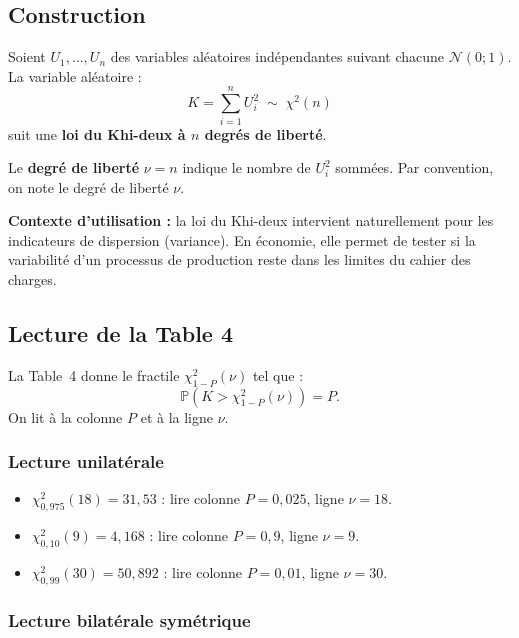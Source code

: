 \documentclass[11pt,a4paper]{article}
\newcommand{\N}{\mathcal{N}}
\newcommand{\Prob}{\mathbb{P}}
\renewcommand{\P}{\Prob}
\begin{document}
\subsection{Construction}

\begin{defbox}
Soient $U_1,\ldots,U_n$ des variables al\'eatoires ind\'ependantes suivant chacune $\N(0;1)$. La variable al\'eatoire :
$$K = \sum_{i=1}^{n} U_i^2 \;\sim\; \chi^2(n)$$
suit une \textbf{loi du Khi-deux \`a $n$ degr\'es de libert\'e}.

Le \textbf{degr\'e de libert\'e} $\nu = n$ indique le nombre de $U_i^2$ somm\'ees. Par convention, on note le degr\'e de libert\'e $\nu$.
\end{defbox}

\textbf{Contexte d'utilisation :} la loi du Khi-deux intervient naturellement pour les indicateurs de dispersion (variance). En \'economie, elle permet de tester si la variabilit\'e d'un processus de production reste dans les limites du cahier des charges.

\subsection{Lecture de la Table 4}

\begin{defbox}
La Table~4 donne le fractile $\chi^2_{1-P}(\nu)$ tel que :
$$\P\!\left(K > \chi^2_{1-P}(\nu)\right) = P.$$
On lit \`a la colonne $P$ et \`a la ligne $\nu$.
\end{defbox}

\subsubsection{Lecture unilatérale}

\begin{exbox}[Exemples]
\begin{itemize}
\item $\chi^2_{0{,}975}(18) = 31{,}53$ : lire colonne $P = 0{,}025$, ligne $\nu = 18$.
\item $\chi^2_{0{,}10}(9) = 4{,}168$ : lire colonne $P = 0{,}9$, ligne $\nu = 9$.
\item $\chi^2_{0{,}99}(30) = 50{,}892$ : lire colonne $P = 0{,}01$, ligne $\nu = 30$.
\end{itemize}
\end{exbox}

\subsubsection{Lecture bilat\'erale sym\'etrique}
\end{document}
